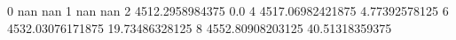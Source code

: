0 nan nan
1 nan nan
2 4512.2958984375 0.0
4 4517.06982421875 4.77392578125
6 4532.03076171875 19.73486328125
8 4552.80908203125 40.51318359375
